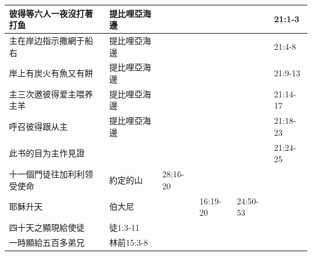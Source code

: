 \begin{table}[H]
\begin{tabular}{p{14em}|p{7.93em}|l|l|l|p{4.855em}}
彼得等六人一夜沒打著打鱼&提比哩亞海邊 &       &&&21:1-3\\\midrule
主在岸边指示撒網于船右&提比哩亞海邊 &       &&&21:4-8\\\midrule

岸上有炭火有魚又有餅&提比哩亞海邊 &       &&&21:9-13\\\midrule
主三次邀彼得爱主喂养主羊&提比哩亞海邊 &       &&&21:14-17\\\midrule

呼召彼得跟从主&提比哩亞海邊 &       &&&21:18-23\\\midrule
此书的目为主作見證&&       &&&21:24-25\\\midrule

十一個門徒往加利利领受使命&約定的山&28:16-20 &       &&  \\\bottomrule
耶穌升天&伯大尼 &       & 16:19-20&24:50-53&  \\\midrule
四十天之顯現給使徒&徒1:3-11 & &&&\\\midrule
一時顯給五百多弟兄&林前15:3-8 & &&&\\\bottomrule

    \end{tabular}%
  \label{tab:addlabel}%
\end{table}%
